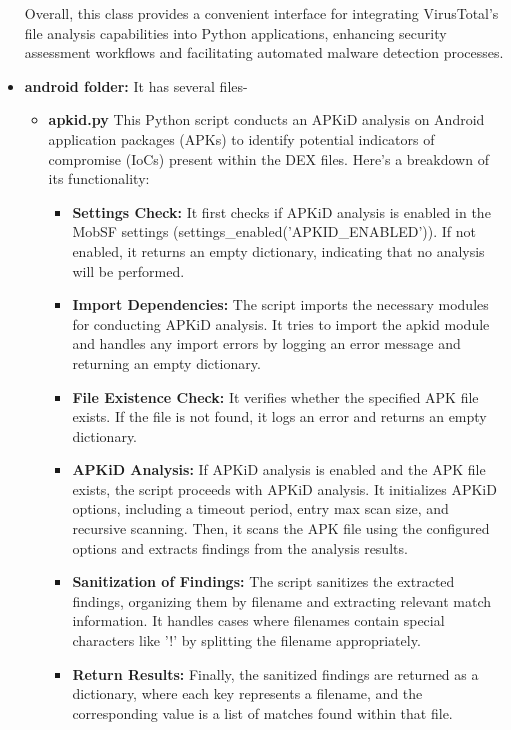 \documentclass{report}
\begin{document}
\begin{itemize}
\begin{itemize}
    \end{itemize}
    Overall, this class provides a convenient interface for integrating VirusTotal's file analysis capabilities into Python applications, enhancing security assessment workflows and facilitating automated malware detection processes.

    \item \textbf{android folder:}
    It has several files-
    \begin{itemize}
        \item \textbf {apkid.py}
        This Python script conducts an APKiD analysis on Android application packages (APKs) to identify potential indicators of compromise (IoCs) present within the DEX files. Here's a breakdown of its functionality:
        \begin{itemize}        
            \item \textbf {Settings Check:} It first checks if APKiD analysis is enabled in the MobSF settings (settings\_enabled('APKID\_ENABLED')). If not enabled, it returns an empty dictionary, indicating that no analysis will be performed.     
            \item \textbf{Import Dependencies:} The script imports the necessary modules for conducting APKiD analysis. It tries to import the apkid module and handles any import errors by logging an error message and returning an empty dictionary.            
            \item \textbf {File Existence Check:} It verifies whether the specified APK file exists. If the file is not found, it logs an error and returns an empty dictionary.            
            \item \textbf{APKiD Analysis:} If APKiD analysis is enabled and the APK file exists, the script proceeds with APKiD analysis. It initializes APKiD options, including a timeout period, entry max scan size, and recursive scanning. Then, it scans the APK file using the configured options and extracts findings from the analysis results.         
            \item \textbf{Sanitization of Findings:} The script sanitizes the extracted findings, organizing them by filename and extracting relevant match information. It handles cases where filenames contain special characters like '!' by splitting the filename appropriately.          
            \item \textbf{Return Results:} Finally, the sanitized findings are returned as a dictionary, where each key represents a filename, and the corresponding value is a list of matches found within that file.
        \end{itemize}
    \end{itemize}


\end{itemize}
\end{document}
